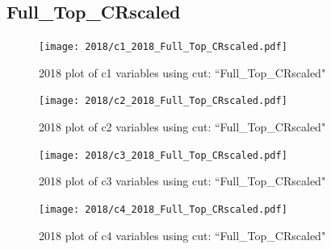 \documentclass{article}
\begin{document}
      \subsection*{Full\_Top\_CRscaled}
                        \begin{figure}[H]
                            \centering
                            \caption{2018 plot of c1 variables using cut: ``Full\_Top\_CRscaled"}
                            \texttt{[image: 2018/c1\_2018\_Full\_Top\_CRscaled.pdf]}
                        \end{figure}    
                        \begin{figure}[H]
                            \centering
                            \caption{2018 plot of c2 variables using cut: ``Full\_Top\_CRscaled"}
                            \texttt{[image: 2018/c2\_2018\_Full\_Top\_CRscaled.pdf]}
                        \end{figure}    
                        \begin{figure}[H]
                            \centering
                            \caption{2018 plot of c3 variables using cut: ``Full\_Top\_CRscaled"}
                            \texttt{[image: 2018/c3\_2018\_Full\_Top\_CRscaled.pdf]}
                        \end{figure}    
                        \begin{figure}[H]
                            \centering
                            \caption{2018 plot of c4 variables using cut: ``Full\_Top\_CRscaled"}
                            \texttt{[image: 2018/c4\_2018\_Full\_Top\_CRscaled.pdf]}
                        \end{figure}    
\end{document}
